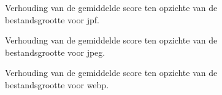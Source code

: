 \FloatBarrier
\begin{figure}[h!]
	\centering
	\caption{Verhouding van de gemiddelde score ten opzichte van de bestandsgrootte voor \gls{jpf}.}
	\label{fig:onderzoek-resultaten-lossy-ratio-jpf}
\end{figure}
\FloatBarrier

\FloatBarrier
\begin{figure}[h!]
	\centering
	\caption{Verhouding van de gemiddelde score ten opzichte van de bestandsgrootte voor \gls{jpeg}.}
	\label{fig:onderzoek-resultaten-lossy-ratio-jpg}
\end{figure}
\FloatBarrier

\FloatBarrier
\begin{figure}[h!]
	\centering
	\caption{Verhouding van de gemiddelde score ten opzichte van de bestandsgrootte voor \gls{webp}.}
	\label{fig:onderzoek-resultaten-lossy-ratio-webp}
\end{figure}
\FloatBarrier